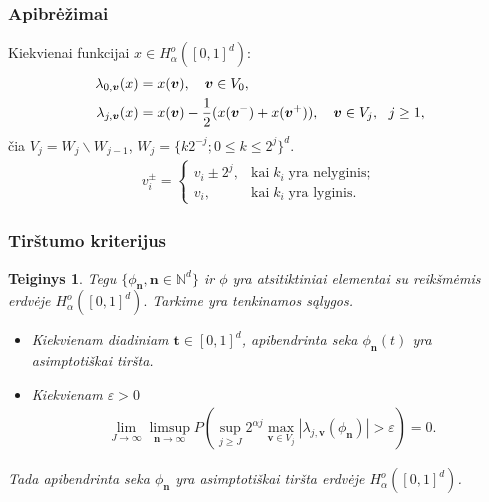 \documentclass[utf8,hyperref={unicode}]{beamer}
\newcommand{\ab}[1]{#1_{\alpha}}
\newcommand{\eps}{\varepsilon}
\theoremstyle{change}\newtheorem{teorema}{Teiginys}
\theoremstyle{change}\newtheorem{salyga}{}
\begin{document}
\begin{frame}
    \frametitle{Apibrėžimai} 
    Kiekvienai funkcijai $x\in {H}^o_\alpha([0,1]^d)$:
    \begin{align*}
	\lambda_{0,\bm{v}}(x)&=x(\bm{v}),\quad \bm{v}\in V_0,\notag \\
	\lambda_{j,\bm{v}}(x)&=x(\bm{v})-\dfrac{1}{2}(x(\bm{v}^-)+x(\bm{v}^+)),\quad
	\bm{v}\in V_j,\ \ j\ge 1,
    \end{align*}
    čia $V_j=W_j\backslash W_{j-1}$, $W_j=\{k2^{-j};0\le k\le 2^j\}^d$.
\begin{align*}
  v_i^\pm=
  \begin{cases}
    v_i\pm2^j, & \text{kai}\; k_i\; \text{yra nelyginis};  \\
     v_i,& \text{kai}\; k_i\; \text{yra lyginis}.
  \end{cases}
\end{align*}    
\end{frame}
\begin{frame}
    \frametitle{Tirštumo kriterijus} 
   \begin{teorema}\label{t:tight}
    Tegu $\{\phi_{\bm{n}}, \bm{n}\in\mathbb{N}^d\}$ ir $\phi$ yra atsitiktiniai
    elementai su reikšmėmis erdvėje $H^o_\alpha([0,1]^d).$ Tarkime yra tenkinamos
    sąlygos.
\begin{itemize}
    \item[i)] Kiekvienam diadiniam $\bm{t}\in [0,1]^d$, 
	 apibendrinta seka $\phi_{\bm{n}}(t)$ yra
	asimptotiškai tiršta.
   \item[ii)]  Kiekvienam $\eps>0$
    \begin{align*}
        \lim_{J\to \infty} \limsup_{\bm{n}\to\infty}P(\sup_{j\ge J}2^{\alpha j}\max_{\bm{v}\in
        V_j}|\lambda_{j,\bm{v}}(\phi_{\bm{n}})|>\eps) = 0.
    \end{align*}
\end{itemize}
Tada apibendrinta seka $\phi_{\bm{n}}$ yra asimptotiškai tiršta erdvėje
$\ab{H}^o([0,1]^d)$.
\end{teorema}
\end{frame}
\end{document}
